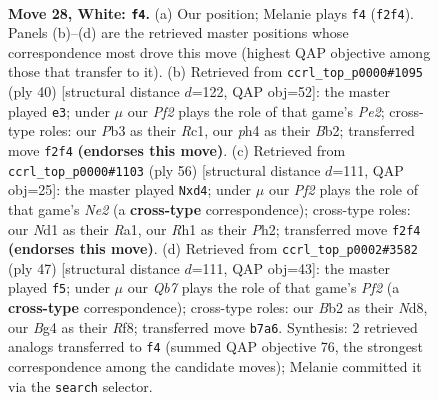 \documentclass[11pt]{article}
\begin{document}
\clearpage

\begin{figure}[p]\centering
\begin{subfigure}{0.46\textwidth}\centering
\resizebox{\linewidth}{!}{%
\newchessgame
\chessboard[
  setfen={1n1qkbr1/1Q2n3/r1p3p1/p2p2P1/3P2Bp/RP5P/1BP1KP2/3N3R w - - 1 28},
  showmover=false,
  pgfstyle=straightmove, color=movearrow, markmove={f2-f4}
]}
\caption{}
\end{subfigure}\hfill
\begin{subfigure}{0.46\textwidth}\centering
\resizebox{\linewidth}{!}{%
\newchessgame
\chessboard[
  setfen={r2r2k1/p3qpp1/2Q2n1p/3n1b2/4p3/1P4PN/PB2PPBP/R1R3K1 w - - 1 21},
  showmover=false,
  pgfstyle=straightmove, color=movearrow, markmove={e2-e3}
]}
\caption{}
\end{subfigure}
\\[4pt]
\begin{subfigure}{0.46\textwidth}\centering
\resizebox{\linewidth}{!}{%
\newchessgame
\chessboard[
  setfen={2q2nk1/2n2rpp/b3p3/3pPpQ1/B2p4/3N1P2/2P1N1PP/R6K w - - 0 29},
  showmover=false,
  pgfstyle=straightmove, color=movearrow, markmove={e2-d4}
]}
\caption{}
\end{subfigure}\hfill
\begin{subfigure}{0.46\textwidth}\centering
\resizebox{\linewidth}{!}{%
\newchessgame
\chessboard[
  setfen={3n1rk1/1q2bpp1/3pb2p/1Pp1p3/R1P5/1B2N3/2QN1PPP/6K1 b - - 0 24},
  showmover=false,
  pgfstyle=straightmove, color=movearrow, markmove={f7-f5}
]}
\caption{}
\end{subfigure}
\caption{\textbf{Move 28, White: \texttt{f4}.} (a) Our position; Melanie plays \texttt{f4} (\texttt{f2f4}). Panels (b)--(d) are the retrieved master positions whose correspondence most drove this move (highest QAP objective among those that transfer to it). (b) Retrieved from \texttt{ccrl\_top\_p0000\#1095} (ply 40) [structural distance $d$=122, QAP obj=52]: the master played \texttt{e3}; under $\mu$ our \emph{Pf2} plays the role of that game's \emph{Pe2}; cross-type roles: our \emph{P}b3 as their \emph{R}c1, our \emph{p}h4 as their \emph{B}b2; transferred move \texttt{f2f4} \textbf{(endorses this move)}. (c) Retrieved from \texttt{ccrl\_top\_p0000\#1103} (ply 56) [structural distance $d$=111, QAP obj=25]: the master played \texttt{Nxd4}; under $\mu$ our \emph{Pf2} plays the role of that game's \emph{Ne2} (a \textbf{cross-type} correspondence); cross-type roles: our \emph{N}d1 as their \emph{R}a1, our \emph{R}h1 as their \emph{P}h2; transferred move \texttt{f2f4} \textbf{(endorses this move)}. (d) Retrieved from \texttt{ccrl\_top\_p0002\#3582} (ply 47) [structural distance $d$=111, QAP obj=43]: the master played \texttt{f5}; under $\mu$ our \emph{Qb7} plays the role of that game's \emph{Pf2} (a \textbf{cross-type} correspondence); cross-type roles: our \emph{B}b2 as their \emph{N}d8, our \emph{B}g4 as their \emph{R}f8; transferred move \texttt{b7a6}. Synthesis: 2 retrieved analogs transferred to \texttt{f4} (summed QAP objective 76, the strongest correspondence among the candidate moves); Melanie committed it via the \texttt{search} selector.}
\label{fig:thought-m54}
\end{figure}
\end{document}
